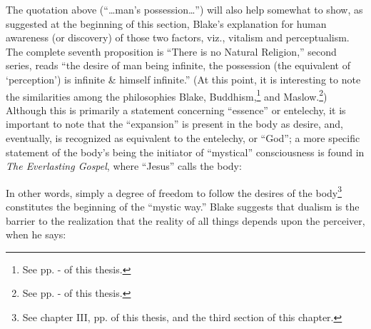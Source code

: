 The quotation above (\enquote{\dots man's possession\dots}) will also help somewhat to show, as suggested at the beginning of this section, Blake's
explanation for human awareness (or discovery) of those two factors, viz., vitalism and perceptualism. The complete seventh proposition is \enquote{There is no Natural Religion,} second
series,\supercite{keynes:william-blake}
reads \enquote{the desire of man being infinite, the possession (the equivalent of \enquote*{perception}) is infinite \& himself infinite.}\supercite{keynes:william-blake}
(At this point, it is interesting to note the similarities among the philosophies
Blake, Buddhism,\footnote{See pp. \pageref{self:01}-\pageref{self:18} of this thesis.} and Maslow.\footnote{See pp. \pageref{self:29}-\pageref{self:30} of this thesis.}) Although this is primarily a statement concerning \enquote{essence} or entelechy, it is important to note
that the \enquote{expansion} is present in the body as desire, and, eventually, is recognized as equivalent to the entelechy, or \enquote{God}; a more specific
statement of the body's being the initiator of \enquote{mystical} consciousness is found in \emph{The Everlasting Gospel}, where \enquote{Jesus} calls the body:



In other words, simply a degree of freedom to follow the desires of the body\footnote{See chapter III, pp. \pageref{self:31} of this thesis, and the third section of this chapter.}
constitutes the beginning of the \enquote{mystic way.}
Blake suggests that dualism is the barrier to the realization that the reality of all things depends upon the perceiver, when he says:

\clearpage

\label{self:22}



